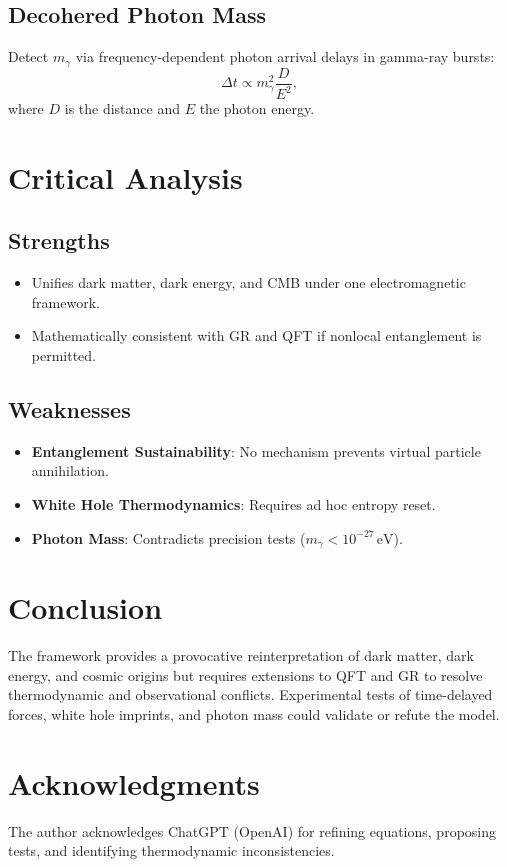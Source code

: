 \documentclass{article}
\begin{document}
\subsection{Decohered Photon Mass}
Detect \( m_{\gamma} \) via frequency-dependent photon arrival delays in gamma-ray bursts:
\[
\Delta t \propto m_{\gamma}^2 \frac{D}{E^2},
\]
where \( D \) is the distance and \( E \) the photon energy.

\section{Critical Analysis}
\subsection{Strengths}
\begin{itemize}
    \item Unifies dark matter, dark energy, and CMB under one electromagnetic framework.
    \item Mathematically consistent with GR and QFT if nonlocal entanglement is permitted.
\end{itemize}

\subsection{Weaknesses}
\begin{itemize}
    \item \textbf{Entanglement Sustainability}: No mechanism prevents virtual particle annihilation.
    \item \textbf{White Hole Thermodynamics}: Requires ad hoc entropy reset.
    \item \textbf{Photon Mass}: Contradicts precision tests (\( m_{\gamma} < 10^{-27} \, \text{eV} \)).
\end{itemize}

\section{Conclusion}
The framework provides a provocative reinterpretation of dark matter, dark energy, and cosmic origins but requires extensions to QFT and GR to resolve thermodynamic and observational conflicts. Experimental tests of time-delayed forces, white hole imprints, and photon mass could validate or refute the model.

\section*{Acknowledgments}
The author acknowledges ChatGPT (OpenAI) for refining equations, proposing tests, and identifying thermodynamic inconsistencies.



\end{document}
